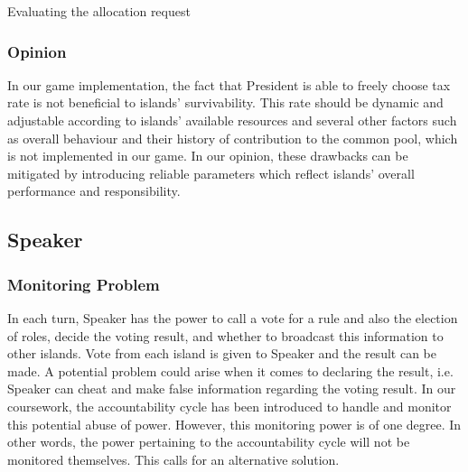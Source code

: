\begin{algorithm}[H]
\SetAlgoLined
    \caption{Evaluating the allocation request}
\end{algorithm}

\subsubsection{Opinion} \label{subsubsec:Team6_President:Opinion}
In our game implementation, the fact that President is able to freely choose tax rate is not beneficial to islands’ survivability. This rate should be dynamic and adjustable according to islands’ available resources and several other factors such as overall behaviour and their history of contribution to the common pool, which is not implemented in our game. In our opinion, these drawbacks can be mitigated by introducing reliable parameters which reflect islands’ overall performance and responsibility.

\subsection{Speaker} \label{subsec:Team6_Speaker}
\subsubsection{Monitoring Problem} \label{subsubsec:Team6_Speaker:Problem}
In each turn, Speaker has the power to call a vote for a rule and also the election of roles, decide the voting result, and whether to broadcast this information to other islands. Vote from each island is given to Speaker and the result can be made.
A potential problem could arise when it comes to declaring the result, i.e. Speaker can cheat and make false information regarding the voting result. In our coursework, the accountability cycle has been introduced to handle and monitor this potential abuse of power. However, this monitoring power is of one degree. In other words, the power pertaining to the accountability cycle will not be monitored themselves. This calls for an alternative solution.

